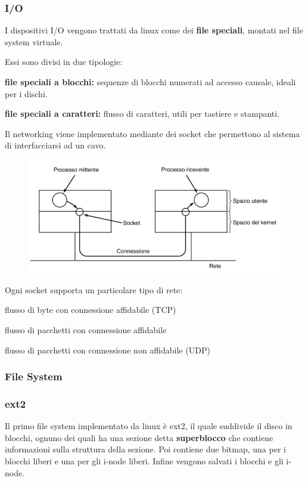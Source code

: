 \subsubsection{I/O}
I dispositivi I/O vengono trattati da linux come dei \textbf{file speciali}, montati nel file system virtuale.

\spacer
Essi sono divisi in due tipologie:
\begin{sitemize}
    \item \textbf{file speciali a blocchi:} sequenze di blocchi numerati ad accesso causale, ideali per i dischi.
    \item \textbf{file speciali a caratteri:} flusso di caratteri, utili per tastiere e stampanti.
\end{sitemize}

\spacer
Il networking viene implementato mediante dei socket che permettono al sistema di interfacciarsi ad un cavo.

\begin{figure}[H]
    \centering
    \includegraphics[width=0.5\linewidth]{assets/linux-socket.jpeg}
\end{figure}

Ogni socket supporta un particolare tipo di rete:
\begin{sitemize}
    \item flusso di byte con connessione affidabile (TCP)
    \item flusso di pacchetti con connessione affidabile
    \item flusso di pacchetti con connessione non affidabile (UDP)
\end{sitemize}

\subsubsection{File System}

\subsubsection{ext2}
Il primo file system implementato da linux è ext2, il quale suddivide il disco in blocchi, ognuno dei quali ha una sezione detta \textbf{superblocco} che contiene informazioni sulla struttura della sezione.
Poi contiene due bitmap, una per i blocchi liberi e una per gli i-node liberi.
Infine vengono salvati i blocchi e gli i-node.

